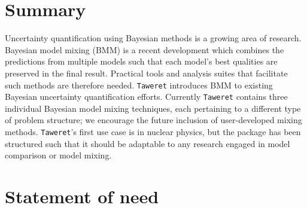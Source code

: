 \documentclass[10pt, preprint,aps,prc,floatfix,
tightenlines,
nofootinbib,superscriptaddress]{revtex4-2}
\begin{document}
\section{Summary}
Uncertainty quantification using Bayesian methods is a growing area of research.
Bayesian model mixing (BMM) is a recent development which combines the predictions from multiple models such that each model's best qualities are preserved in the final result. 
Practical tools and analysis suites that facilitate such methods are therefore needed.
\texttt{Taweret} introduces BMM to existing Bayesian uncertainty quantification efforts. Currently \texttt{Taweret} contains three individual Bayesian model mixing techniques, each pertaining to a different type of problem structure; we encourage the future inclusion of user-developed mixing methods.
\texttt{Taweret}'s first use case is in nuclear physics, but the package has been structured such that it should be adaptable to any research engaged in model comparison or model mixing.

\section{Statement of need}
\end{document}
